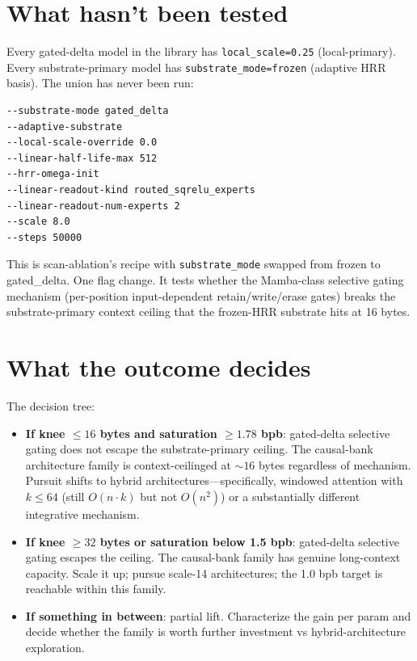 \documentclass[11pt,openany]{book}
\begin{document}
\section{What hasn't been tested}

Every gated-delta model in the library has \texttt{local\_scale=0.25}
(local-primary). Every substrate-primary model has
\texttt{substrate\_mode=frozen} (adaptive HRR basis). The union has never
been run:

\begin{lstlisting}[caption={The untested recipe},basicstyle=\ttfamily\small]
--substrate-mode gated_delta
--adaptive-substrate
--local-scale-override 0.0
--linear-half-life-max 512
--hrr-omega-init
--linear-readout-kind routed_sqrelu_experts
--linear-readout-num-experts 2
--scale 8.0
--steps 50000
\end{lstlisting}

This is scan-ablation's recipe with \texttt{substrate\_mode} swapped from
frozen to gated\_delta. One flag change. It tests whether the Mamba-class
selective gating mechanism (per-position input-dependent retain/write/erase
gates) breaks the substrate-primary context ceiling that the frozen-HRR
substrate hits at 16 bytes.

\section{What the outcome decides}

The decision tree:

\begin{itemize}
  \item \textbf{If knee $\leq 16$ bytes and saturation $\geq 1.78$ bpb}:
  gated-delta selective gating does not escape the substrate-primary
  ceiling. The causal-bank architecture family is context-ceilinged at
  $\sim 16$ bytes regardless of mechanism. Pursuit shifts to hybrid
  architectures---specifically, windowed attention with $k \leq 64$ (still
  $O(n\cdot k)$ but not $O(n^2)$) or a substantially different integrative
  mechanism.
  \item \textbf{If knee $\geq 32$ bytes or saturation below 1.5 bpb}:
  gated-delta selective gating escapes the ceiling. The causal-bank family
  has genuine long-context capacity. Scale it up; pursue scale-14
  architectures; the 1.0 bpb target is reachable within this family.
  \item \textbf{If something in between}: partial lift. Characterize the
  gain per param and decide whether the family is worth further investment
  vs hybrid-architecture exploration.
\end{itemize}
\end{document}
